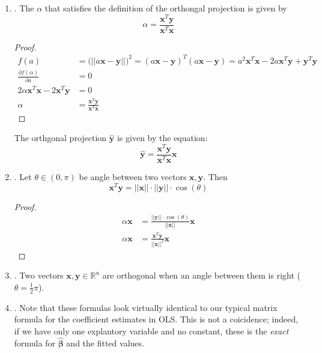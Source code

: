 \documentclass[12pt]{article}
\begin{document}
\begin{enumerate}
\begin{enumerate}
\newpage
		\item\underline{}.
		The $\alpha$ that satisfies the definition of the orthongal projection is given by
		\[\alpha = \frac{\mathbf{x}^T\mathbf{y}}{\mathbf{x}^T\mathbf{x}}\]
		\begin{proof}
			\begin{align*}
			f(a) &= \Big(|| a \mathbf{x} - \mathbf{y} ||\Big)^2 = (a \mathbf{x} - \mathbf{y})^T (a \mathbf{x} - \mathbf{y}) = a^2 \mathbf{x}^T \mathbf{x} - 2 a \mathbf{x}^T \mathbf{y} + \mathbf{y}^T \mathbf{y} \\
			\frac{\partial f(\alpha )}{\partial a} &= 0 \\ 
			2 \alpha \mathbf{x}^T \mathbf{x} -2 \mathbf{x}^T\mathbf{y} &= 0 \\ 
			\alpha &= \frac{\mathbf{x}^T\mathbf{y}}{\mathbf{x}^T\mathbf{x}}
			\end{align*}
		\end{proof}
		The orthgonal projection $\hat{\mathbf{y}}$ is given by the equation:
		\[\hat{\mathbf{y}}=\frac{\mathbf{x}^T\mathbf{y}}{\mathbf{x}^T\mathbf{x}}\mathbf{x}\]

		\item\underline{}.
		Let $\theta \in (0, \pi)$ be angle between two vectors $\mathbf{x}, \mathbf{y}$. Then
		\[ \mathbf{x}^T \mathbf{y} = ||\mathbf{x}|| \cdot ||\mathbf{y}|| \cdot \cos(\theta)  \]
		\begin{proof}
			\begin{align*}
			\alpha \mathbf{x} &= \frac{ || \mathbf{y} || \cdot \cos(\theta)}{||\mathbf{x}||} \mathbf{x} \\ 
			\alpha \mathbf{x} & = \frac{\mathbf{x}^T\mathbf{y}}{||\mathbf{x}||^2} \mathbf{x} 
			\end{align*}
		\end{proof}
		
		\item\underline{}.
		Two vectors $\mathbf{x}, \mathbf{y} \in \mathbb{R}^n$ are orthogonal when an angle between them is right ($\theta = \frac{1}{2} \pi$). 
		
		\item\underline{}.
		Note that these formulas look virtually identical to our typical matrix formula for the coefficient estimates in OLS.
		This is not a coicidence; indeed, if we have only one explantory variable and no constant, these is the \emph{exact}
		formula for $\widehat{\boldsymbol{\beta}}$ and the fitted values.
		

\end{enumerate}
\end{enumerate}
\end{document}
